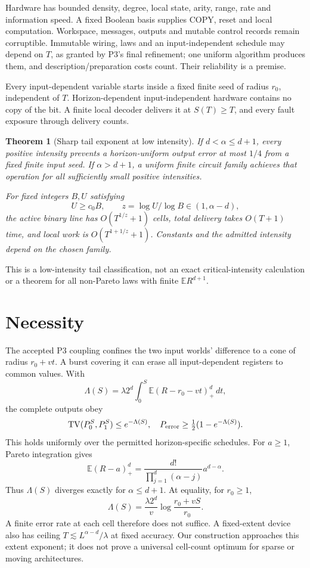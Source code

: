 \documentclass[11pt,a4paper]{article}
\newtheorem{theorem}{Theorem}\newtheorem{lemma}{Lemma}
\newcommand{\TV}{\operatorname{TV}}
\newcommand{\E}{\mathbb E}\newcommand{\Prb}{\mathbb P}
\begin{document}
Hardware has bounded density, degree, local state, arity, range, rate and information speed. A fixed Boolean basis supplies COPY, reset and local computation. Workspace, messages, outputs and mutable control records remain corruptible. Immutable wiring, laws and an input-independent schedule may depend on $T$, as granted by P3's final refinement; one uniform algorithm produces them, and description/preparation costs count. Their reliability is a premise.\cite{p3}

Every input-dependent variable starts inside a fixed finite seed of radius $r_0$, independent of $T$. Horizon-dependent input-independent hardware contains no copy of the bit. A finite local decoder delivers it at $S(T)\ge T$, and every fault exposure through delivery counts.

\begin{theorem}[Sharp tail exponent at low intensity]\label{thm:main}
If $d<\alpha\le d+1$, every positive intensity prevents a horizon-uniform output error at most $1/4$ from a fixed finite input seed. If $\alpha>d+1$, a uniform finite circuit family achieves that operation for all sufficiently small positive intensities.

For fixed integers $B,U$ satisfying
\[
 U\ge c_0B,\qquad z=\log U/\log B\in(1,\alpha-d),
\]
the active binary line has $O(T^{1/z}+1)$ cells, total delivery takes $O(T+1)$ time, and local work is $O(T^{1+1/z}+1)$. Constants and the admitted intensity depend on the chosen family.
\end{theorem}
This is a low-intensity tail classification, not an exact critical-intensity calculation or a theorem for all non-Pareto laws with finite $\E R^{d+1}$.

\section{Necessity}
The accepted P3 coupling confines the two input worlds' difference to a cone of radius $r_0+vt$. A burst covering it can erase all input-dependent registers to common values. With
\[
 \Lambda(S)=\lambda2^d\int_0^S\E(R-r_0-vt)_+^d\,dt,
\]
the complete outputs obey
\[
 \TV(P_0^S,P_1^S)\le e^{-\Lambda(S)},\quad
 P_{\rm error}\ge\tfrac12(1-e^{-\Lambda(S)}).
\]
This holds uniformly over the permitted horizon-specific schedules.\cite{p3}
For $a\ge1$, Pareto integration gives
\[
 \E(R-a)_+^d=\frac{d!}{\prod_{j=1}^d(\alpha-j)}a^{d-\alpha}.
\]
Thus $\Lambda(S)$ diverges exactly for $\alpha\le d+1$. At equality, for $r_0\ge1$,
\[
 \Lambda(S)=\frac{\lambda2^d}{v}\log\frac{r_0+vS}{r_0}.
\]
A finite error rate at each cell therefore does not suffice. A fixed-extent device also has ceiling $T\lesssim L^{\alpha-d}/\lambda$ at fixed accuracy. Our construction approaches this extent exponent; it does not prove a universal cell-count optimum for sparse or moving architectures.
\end{document}
